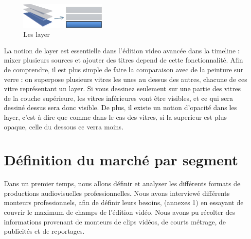 \begin{figure}

  \begin{center}

    \vspace{-20pt} \includegraphics[width=0.38\textwidth]{images/layers}

  \end{center} \vspace{-20pt} \caption{Les layer} \label{Yes}

\end{figure}

La notion de layer est essentielle dans l'édition video avancée dans
la timeline : mixer plusieurs sources et ajouter des titres depend de
cette fonctionnalité. Afin de comprendre, il est plus simple de faire
la comparaison avec de la peinture sur verre : on superpose plusieurs
vitres les unes au dessus des autres, chacune de ces vitre représentant
un layer. Si vous dessinez seulement sur une partie des vitres de la
couche supérieure, les vitres inférieures vont être visibles, et
ce qui sera dessiné dessus sera donc visible.  De plus, il existe un
notion d'opacité dans les layer, c'est à dire que comme dans le cas
des vitres, si la superieur est plus opaque, celle du dessous ce verra
moins. %

\newpage

\section{Définition du marché par segment}

\paragraph{}

Dans un premier temps, nous allons définir et analyser les différents
formats de productions audiovisuelles professionnelles.  Nous avons
interviewé différents monteurs professionnels, afin de définir leurs
besoins, (annexes 1) en essayant de couvrir le maximum de champs de
l'édition vidéo. Nous avons pu récolter des informations provenant
de monteurs de clips vidéos, de courts métrage, de publicités et
de reportages.


